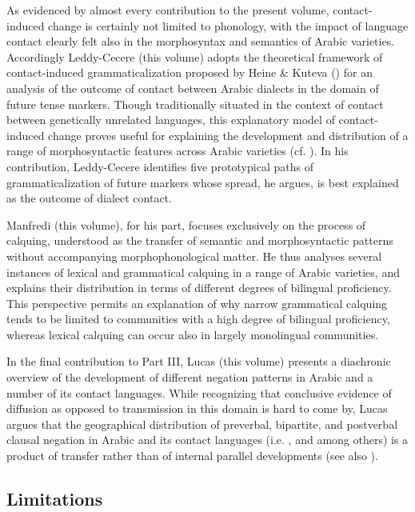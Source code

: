 \documentclass[output=paper]{langsci/langscibook}
\begin{document}
As evidenced by almost every contribution to the present volume, contact-induced change is certainly not limited to phonology, with the impact of language contact clearly felt also in the morphosyntax and semantics of Arabic varieties. Accordingly Leddy-Cecere (this volume) adopts the theoretical framework of contact-induced grammaticalization proposed by Heine \& Kuteva (\citeyear{HeineKuteva2003,HeineKuteva2005}) for an analysis of the outcome of contact between Arabic dialects in the domain of future tense markers. Though traditionally situated in the context of contact between genetically unrelated languages, this explanatory model of contact-induced change proves useful for explaining the development and distribution of a range of morphosyntactic features across Arabic varieties (cf. \citealt{Leddy-Cecere2018}). In his contribution, Leddy-Cecere identifies five prototypical paths of grammaticalization of future markers whose spread, he argues, is best explained as the outcome of dialect contact.

Manfredi (this volume), for his part, focuses exclusively on the process of calquing, understood as the transfer of semantic and morphosyntactic patterns without accompanying morphophonological matter. He thus analyses several instances of lexical and grammatical calquing in a range of Arabic varieties, and explains their distribution in terms of different degrees of bilingual proficiency. This perspective permits an explanation of why narrow grammatical calquing tends to be limited to communities with a high degree of bilingual proficiency, whereas lexical calquing can occur also in largely monolingual communities.

In the final contribution to Part III, Lucas (this volume) presents a diachronic overview of the development of different negation patterns in Arabic and a number of its contact languages. While recognizing that conclusive evidence of diffusion as opposed to transmission in this domain is hard to come by, Lucas argues that the geographical distribution of preverbal, bipartite, and postverbal clausal negation in Arabic and its contact languages (i.e. ,  and  among others) is a product of transfer rather than of internal parallel developments (see also \citealt{LucasLash2010}). 


\subsection{Limitations}\label{introlimitations}
\end{document}
